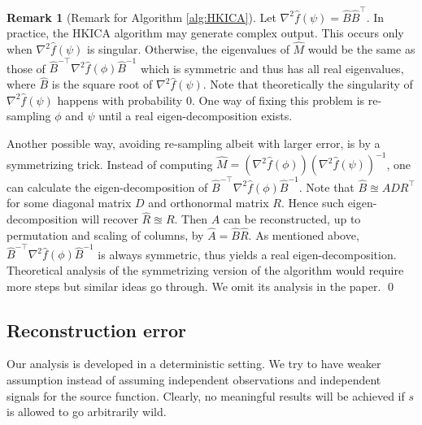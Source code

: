 \documentclass[twoside]{article}
\theoremstyle{definition}
\newtheorem{remark}[lemma]{Remark}
\begin{document}
\begin{remark}[Remark for Algorithm \ref{alg:HKICA}]
\label{rmk:symmetrization}
Let $\nabla^2\widehat{f}(\psi) =\widehat{B}\widehat{B}^{\top} $.
In practice, the HKICA algorithm may generate complex output. 
This occurs only when $\nabla^2\widehat{f}(\psi)$ is singular. 
Otherwise, the eigenvalues of $\widehat{M}$ would be the same as those of
$\widehat{B}^{-\top}\nabla^2 \widehat{f}(\phi)\widehat{B}^{-1}$ which is symmetric and thus has all real eigenvalues, where $\widehat{B} $ is the square root of $\nabla^2\widehat{f}(\psi)$. 
Note that theoretically the singularity of $\nabla^2\widehat{f}(\psi)$ happens with probability 0. 
One way of fixing this problem is re-sampling $\phi$ and $\psi$ until a real eigen-decomposition exists.

Another possible way, avoiding re-sampling albeit with larger error, is by a symmetrizing trick.
Instead of computing $\widehat{M} = (\nabla^2 \widehat{f}(\phi))(\nabla^2\widehat{f}(\psi))^{-1}$, one can calculate the eigen-decomposition of  $\widehat{B}^{-\top}\nabla^2 \widehat{f}(\phi)\widehat{B}^{-1}$. 
Note that $\widehat{B} \approxeq ADR^{\top}$ for some diagonal matrix $D$ and orthonormal matrix $R$. 
Hence such eigen-decomposition will recover $\widehat{R}\approxeq R$. 
Then $A$ can be reconstructed, up to permutation and scaling of columns, by $\widehat{A} = \widehat{B}\widehat{R}$.
As mentioned above, $ \widehat{B}^{-\top}\nabla^2 \widehat{f}(\phi)\widehat{B}^{-1}$ is always symmetric, thus yields a real eigen-decomposition. 
Theoretical analysis of the symmetrizing version of the algorithm would require more steps but similar ideas go through. We omit its analysis in the paper.
\qed
\end{remark}

\subsection{Reconstruction error}
\label{subsec:errorHK}
Our analysis is developed in a deterministic setting.
We try to have weaker assumption instead of assuming independent observations and independent signals for the source function. 
Clearly, no meaningful results will be achieved if $s$ is allowed to go arbitrarily wild. 
 
\end{document}
